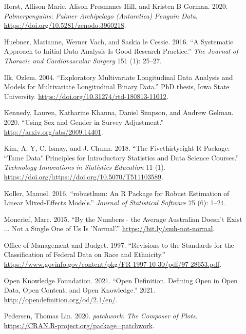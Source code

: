 \documentclass[12pt]{article}
\begin{document}
\leavevmode\hypertarget{ref-penguins-data}{}%
Horst, Allison Marie, Alison Presmanes Hill, and Kristen B Gorman. 2020. \emph{Palmerpenguins: Palmer Archipelago (Antarctica) Penguin Data}. \url{https://doi.org/10.5281/zenodo.3960218}.

\leavevmode\hypertarget{ref-HuebnerMariannePhD2016Asat}{}%
Huebner, Marianne, Werner Vach, and Saskia le Cessie. 2016. ``A Systematic Approach to Initial Data Analysis Is Good Research Practice.'' \emph{The Journal of Thoracic and Cardiovascular Surgery} 151 (1): 25--27.

\leavevmode\hypertarget{ref-ilk2004}{}%
Ilk, Ozlem. 2004. ``Exploratory Multivariate Longitudinal Data Analysis and Models for Multivariate Longitudinal Binary Data.'' PhD thesis, Iowa State University. \url{https://doi.org/10.31274/rtd-180813-11012}.

\leavevmode\hypertarget{ref-kennedy2020using}{}%
Kennedy, Lauren, Katharine Khanna, Daniel Simpson, and Andrew Gelman. 2020. ``Using Sex and Gender in Survey Adjustment.'' \url{http://arxiv.org/abs/2009.14401}.

\leavevmode\hypertarget{ref-tamedata}{}%
Kim, A. Y, C. Ismay, and J. Chunn. 2018. ``The Fivethirtyeight R Package: ``Tame Data" Principles for Introductory Statistics and Data Science Courses.'' \emph{Technology Innovations in Statistics Education} 11 (1). \url{https://doi.org/https://doi.org/10.5070/T511103589}.

\leavevmode\hypertarget{ref-KollerManuel2016rARP}{}%
Koller, Manuel. 2016. ``robustlmm: An R Package for Robust Estimation of Linear Mixed-Effects Models.'' \emph{Journal of Statistical Software} 75 (6): 1--24.

\leavevmode\hypertarget{ref-notaverage}{}%
Moncrief, Marc. 2015. ``By the Numbers - the Average Australian Doesn't Exist ... Not a Single One of Us Is 'Normal'.'' \url{https://bit.ly/smh-not-normal}.

\leavevmode\hypertarget{ref-doh}{}%
Office of Management and Budget. 1997. ``Revisions to the Standards for the Classification of Federal Data on Race and Ethnicity.'' \url{https://www.govinfo.gov/content/pkg/FR-1997-10-30/pdf/97-28653.pdf}.

\leavevmode\hypertarget{ref-opendata}{}%
Open Knowledge Foundation. 2021. ``Open Definition. Defining Open in Open Data, Open Content, and Open Knowledge.'' 2021. \url{http://opendefinition.org/od/2.1/en/}.

\leavevmode\hypertarget{ref-patchwork}{}%
Pedersen, Thomas Lin. 2020. \emph{patchwork: The Composer of Plots}. \url{https://CRAN.R-project.org/package=patchwork}.
\end{document}

